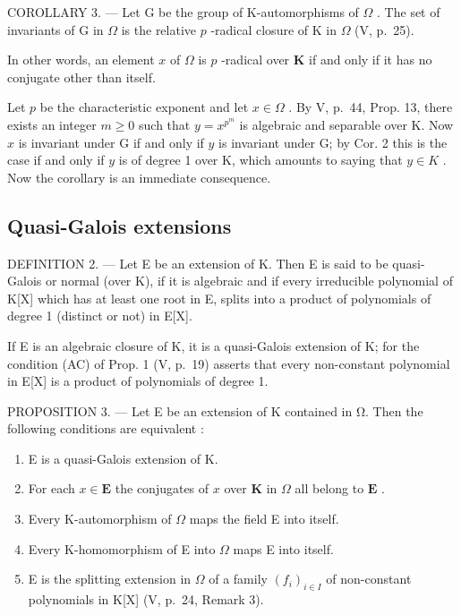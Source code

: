 COROLLARY 3. --- Let G be the group of K-automorphisms of \(\Omega\) . The set of invariants of G in \(\Omega\) is the relative \(p\) -radical closure of K in \(\Omega\) (V, p.~25).

In other words, an element \(x\) of \(\Omega\) is \(p\) -radical over \(\mathbf{K}\) if and only if it has no conjugate other than itself.

Let \(p\) be the characteristic exponent and let \(x \in \Omega\) . By V, p.~44, Prop. 13, there exists an integer \(m \geqslant 0\) such that \(y = x^{p^m}\) is algebraic and separable over K. Now \(x\) is invariant under G if and only if \(y\) is invariant under G; by Cor. 2 this is the case if and only if \(y\) is of degree 1 over K, which amounts to saying that \(y \in K\) . Now the corollary is an immediate consequence.

\subsection{Quasi-Galois extensions}

DEFINITION 2. --- Let E be an extension of K. Then E is said to be quasi-Galois or normal (over K), if it is algebraic and if every irreducible polynomial of K{[}X{]} which has at least one root in E, splits into a product of polynomials of degree 1 (distinct or not) in E{[}X{]}.

If E is an algebraic closure of K, it is a quasi-Galois extension of K; for the condition (AC) of Prop. 1 (V, p.~19) asserts that every non-constant polynomial in E{[}X{]} is a product of polynomials of degree 1.

PROPOSITION 3. --- Let E be an extension of K contained in Ω. Then the following conditions are equivalent :

\begin{enumerate}
\def\labelenumi{\alph{enumi})}
\item
  E is a quasi-Galois extension of K.
\item
  For each \(x \in \mathbf{E}\) the conjugates of \(x\) over \(\mathbf{K}\) in \(\Omega\) all belong to \(\mathbf{E}\) .
\item
  Every K-automorphism of \(\Omega\) maps the field E into itself.
\item
  Every K-homomorphism of E into \(\Omega\) maps E into itself.
\item
  E is the splitting extension in \(\Omega\) of a family \((f_i)_{i\in I}\) of non-constant polynomials in K{[}X{]} (V, p.~24, Remark 3).
\end{enumerate}


